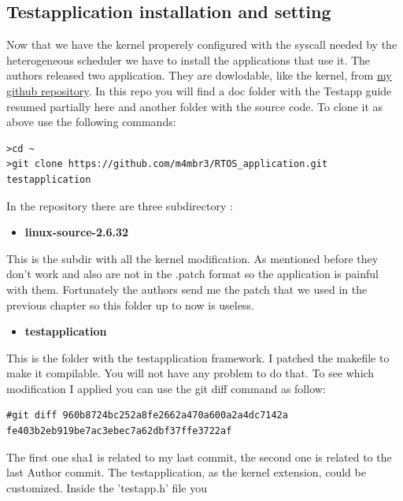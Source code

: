 \documentclass[a4paper,13pt]{article}
\begin{document}
\begin{multicols}{2}
\subsection{Testapplication installation and setting}
    Now that we have the kernel properely configured with the syscall needed by the heterogeneous
    scheduler we have to install the applications that use it. The authors released two application.
    They are dowlodable, like the kernel, from \href{https://github.com/m4mbr3/RTOS_application.git}{my github repository}.
    In this repo you will find a doc folder with the Testapp guide \cite{doc_testapp} resumed partially here and 
    another folder with the source code.
    To clone it as above use the following commands:
\begin{lstlisting}
>cd ~
>git clone https://github.com/m4mbr3/RTOS_application.git testapplication
\end{lstlisting}
    In the repository there are three subdirectory :
    \vspace{4ex}
    \begin{itemize}
        \item{{\bf linux-source-2.6.32}}\\
    \end{itemize}
    \vspace{-2ex}
        This is the subdir with all the kernel modification. As mentioned before they don't work and also
        are not in the .patch format so the application is painful with them. Fortunately the authors
        send me the patch that we used in the previous chapter so this folder up to now is useless.
    \vspace{4ex}
    \begin{itemize}
        \item{{\bf testapplication}}\\
    \end{itemize}
    \vspace{-2ex}
        This is the folder with the testapplication framework. I patched the makefile to make it compilable.
        You will not have any problem to do that. To see which  modification I applied you can use the git diff
        command as follow:
        \begin{lstlisting}
#git diff 960b8724bc252a8fe2662a470a600a2a4dc7142a fe403b2eb919be7ac3ebec7a62dbf37ffe3722af
        \end{lstlisting}
        The first one sha1 is related to my last commit, the second one is related to the last Author commit.
               The testapplication, as the kernel extension, could be customized. Inside the 'testapp.h' file you

\end{multicols}
\end{document}
